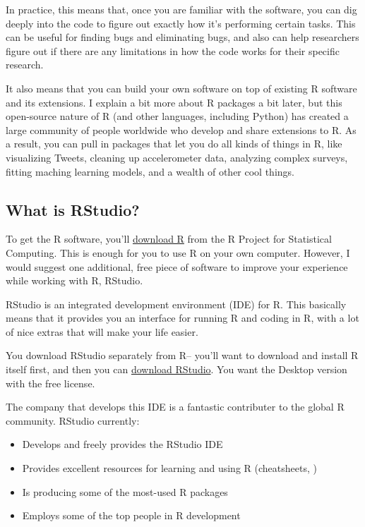 \documentclass[]{book}
\providecommand{\tightlist}{%
  \setlength{\itemsep}{0pt}\setlength{\parskip}{0pt}}
\begin{document}
In practice, this means that, once you are familiar with the software,
you can dig deeply into the code to figure out exactly how it's
performing certain tasks. This can be useful for finding bugs and
eliminating bugs, and also can help researchers figure out if there are
any limitations in how the code works for their specific research.

It also means that you can build your own software on top of existing R
software and its extensions. I explain a bit more about R packages a bit
later, but this open-source nature of R (and other languages, including
Python) has created a large community of people worldwide who develop
and share extensions to R. As a result, you can pull in packages that
let you do all kinds of things in R, like visualizing Tweets, cleaning
up accelerometer data, analyzing complex surveys, fitting maching
learning models, and a wealth of other cool things.

\subsection{What is RStudio?}\label{what-is-rstudio}

To get the R software, you'll \href{https://www.r-project.org}{download
R} from the R Project for Statistical Computing. This is enough for you
to use R on your own computer. However, I would suggest one additional,
free piece of software to improve your experience while working with R,
RStudio.

RStudio is an integrated development environment (IDE) for R. This
basically means that it provides you an interface for running R and
coding in R, with a lot of nice extras that will make your life easier.

You download RStudio separately from R-- you'll want to download and
install R itself first, and then you can
\href{https://www.rstudio.com/products/rstudio/download2/}{download
RStudio}. You want the Desktop version with the free license.

The company that develops this IDE is a fantastic contributer to the
global R community. RStudio currently:

\begin{itemize}
\tightlist
\item
  Develops and freely provides the RStudio IDE
\item
  Provides excellent resources for learning and using R (cheatsheets, )
\item
  Is producing some of the most-used R packages
\item
  Employs some of the top people in R development
\end{itemize}
\end{document}
